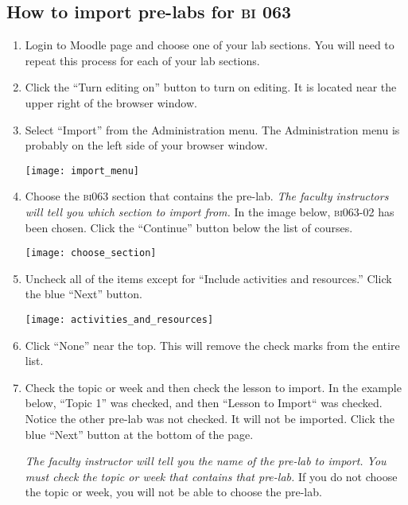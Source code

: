 \documentclass[12pt]{article}
\begin{document}
\subsection*{How to import pre-labs for {\scshape bi} 063}

\begin{enumerate}
	\item Login to Moodle page and choose one of your lab sections. You will need to repeat this process for each of your lab sections.
	
	\item Click the ``Turn editing on'' button to turn on editing. It is located near the upper right of the browser window.
	
	\item Select ``Import'' from the Administration menu. The Administration menu is probably on the left side of your browser window.
	
	{\centering
		\texttt{[image: import\_menu]}\par
	}
	
	\item Choose the \textsc{bi}063 section that contains the pre-lab. \emph{The faculty instructors will tell you which section to import from.} In the image below, \textsc{bi}063-02 has been chosen. Click the ``Continue'' button below the list of courses.
	
	
	
	{\centering
		\texttt{[image: choose\_section]}\par
	}
	
	\item Uncheck all of the items except for ``Include activities and resources.'' Click the blue ``Next'' button.
	
	{\centering
		\texttt{[image: activities\_and\_resources]}\par
	}
	
	\item Click ``None'' near the top. This will remove the check marks from the entire list.
	
	\item Check the topic or week and then check the lesson to import. In the example below, ``Topic 1'' was checked, and then ``Lesson to Import`` was checked. Notice the other pre-lab was not checked. It will not be imported. Click the blue ``Next'' button at the bottom of the page.
	
	\emph{The faculty instructor will tell you the name of the pre-lab to import. You must check the topic or week that contains that pre-lab.} If you do not choose the topic or week, you will not be able to choose the pre-lab.
	

\end{enumerate}
\end{document}
